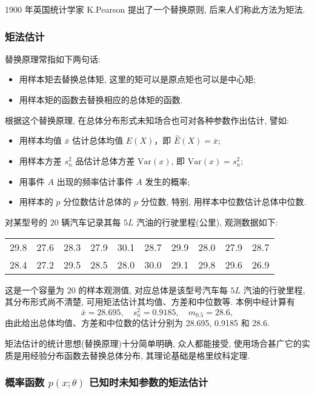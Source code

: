 1900 年英国统计学家 K.Pearson 提出了一个替换原则, 后来人们称此方法为矩法. 

\subsubsection{矩法估计}

替换原理常指如下两句话:
\begin{itemize}
\item 用样本矩去替换总体矩, 这里的矩可以是原点矩也可以是中心矩; 
\item 用样本矩的函数去替换相应的总体矩的函数.
\end{itemize}

根据这个替换原理, 在总体分布形式未知场合也可对各种参数作出估计, 譬如: 
\begin{itemize}
\item 用样本均值 $\bar{x}$ 估计总体均值 $E(X)$，即 $\hat{E}(X)=\bar{x}$;
\item 用样本方差 $s_n^2$ 品估计总体方差 $\mathrm{Var}(x)$, 即 $\mathrm{\hat{V}ar}(x)=s_n^2$;
\item 用事件 $A$ 出现的频率估计事件 $A$ 发生的概率;
\item 用样本的 $p$ 分位数估计总体的 $p$ 分位数, 特别, 用样本中位数估计总体中位数.
\end{itemize}

\begin{example}
对某型号的 $20$ 辆汽车记录其每 $5L$ 汽油的行驶里程(公里), 观测数据如下: 

\begin{tabular}{cccccccccc}
29.8 & 27.6 & 28.3 & 27.9 & 30.1 & 28.7 & 29.9 & 28.0 & 27.9 & 28.7\\
28.4 & 27.2 & 29.5 & 28.5 & 28.0 & 30.0 & 29.1 & 29.8 & 29.6 & 26.9		
\end{tabular}

这是一个容量为 $20$ 的样本观测值, 对应总体是该型号汽车每 $5L$ 汽油的行驶里程, 其分布形式尚不清楚, 可用矩法估计其均值、方差和中位数等. 本例中经计算有
\[\bar{x}=28.695,\quad s_n^2=0.9185,\quad m_{0.5}=28.6,\]
由此给出总体均值、方差和中位数的估计分别为 28.695, 0.9185 和 28.6.
\end{example}

矩法估计的统计思想(替换原理)十分简单明确, 众人都能接受, 使用场合甚广它的实质是用经验分布函数去替换总体分布, 其理论基础是格里纹科定理.

\subsubsection{概率函数 $p(x;\theta)$ 已知时未知参数的矩法估计}

